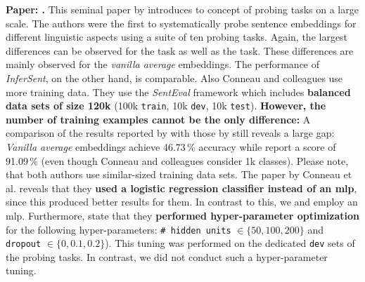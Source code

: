  \textbf{Paper: .} This seminal paper by \citep{Conneau.2018a} introduces to concept of probing tasks on a large scale. The authors were the first to systematically probe sentence embeddings for different linguistic aspects using a suite of ten probing tasks. Again, the largest differences can be observed for the  task as well as the  task. These differences are mainly observed for the \textit{vanilla average} embeddings. The performance of \textit{InferSent}, on the other hand, is comparable. Also Conneau and colleagues use more training data. They use the \textit{SentEval} framework which includes \textbf{balanced data sets of size 120k} (100k \texttt{train}, 10k \texttt{dev}, 10k \texttt{test}). \textbf{However, the number of training examples cannot be the only difference:} A comparison of the  results reported by \citep{Conneau.2018a} with those by \citep{Krasnowska.2019} still reveals a large gap: \textit{Vanilla average} embeddings achieve 46.73\,\% accuracy \citep{Krasnowska.2019} while \citep{Conneau.2018a} report a score of 91.09\,\% (even though Conneau and colleagues consider 1k classes). Please note, that both authors use similar-sized training data sets. The paper by Conneau et al. reveals that they \textbf{used a logistic regression classifier instead of an \gls{mlp}}, since this produced better results for them. In contrast to this, we and \citep{Krasnowska.2019} employ an \gls{mlp}. Furthermore, \citep{Conneau.2018a} state that they \textbf{performed hyper-parameter optimization} for the following hyper-parameters: \texttt{\# hidden units} $\in \{ 50, 100, 200 \}$ and \texttt{dropout} $\in \{ 0, 0.1, 0.2 \}$). This tuning was performed on the dedicated \texttt{dev} sets of the probing tasks. In contrast, we did not conduct such a hyper-parameter tuning.

